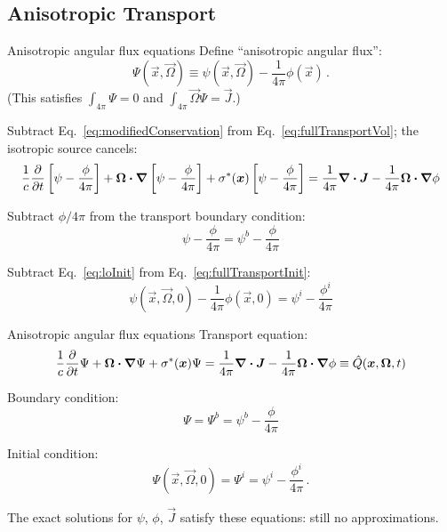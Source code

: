 \documentclass{beamer}
\begin{document}
\subsection{Anisotropic Transport}
\begin{frame}{Anisotropic angular flux equations}
  Define ``anisotropic angular flux'':
  \begin{equation} \label{eq:capPsi}
    \Psi(\vec{x}, \vec{\Omega}) \equiv \psi(\vec{x}, \vec{\Omega})
    - \frac{1}{4\pi} \phi(\vec{x})\,.
  \end{equation}
  (This satisfies $\int_{4\pi} \Psi=0$ and $\int_{4\pi} \vec{\Omega} \Psi =
  \vec{J}$.)

  Subtract Eq.~\eqref{eq:modifiedConservation} from
  Eq.~\eqref{eq:fullTransportVol}; the isotropic source cancels:
\begin{multline*}
  \frac{1}{c} \frac{\partial }{\partial t} \left[ \psi - \frac{\phi}{4\pi} \right]
    + \bm{\Omega}\bm{\cdot} \bm{\nabla} \left[ \psi - \frac{\phi}{4\pi} \right]
    + \sigma^\ast(\bm{x})\left[ \psi - \frac{\phi}{4\pi} \right]
  = \frac{1}{4\pi} \bm{\nabla} \bm{\cdot}\bm{J} -
  \frac{1}{4\pi} \bm{\Omega}\bm{\cdot} \bm{\nabla} \phi
\end{multline*}

  Subtract $\phi/4\pi$ from the transport boundary condition:
  \begin{equation*}
    \psi - \frac{\phi}{4\pi} = \psi^b - \frac{\phi}{4\pi}
  \end{equation*}

  Subtract Eq.~\eqref{eq:loInit} from Eq.~\eqref{eq:fullTransportInit}:
  \begin{equation*}
    \psi(\vec{x}, \vec{\Omega}, 0) - \frac{1}{4\pi}\phi(\vec{x}, 0)
    = \psi^i - \frac{\phi^i}{4\pi}
  \end{equation*}
\end{frame}

\begin{frame}{Anisotropic angular flux equations}
  Transport equation:
\begin{equation*}
  \frac{1}{c} \frac{\partial }{\partial t} \Psi
   + \bm{\Omega}\bm{\cdot} \bm{\nabla} \Psi
   + \sigma^\ast(\bm{x}) \Psi
  = \frac{1}{4\pi} \bm{\nabla} \bm{\cdot}\bm{J} -
  \frac{1}{4\pi} \bm{\Omega}\bm{\cdot} \bm{\nabla} \phi
  \equiv \hat Q(\bm{x}, \bm{\Omega}, t)
\end{equation*}

  Boundary condition:
  \begin{equation*}
    \Psi = \Psi^b = \psi^b - \frac{\phi}{4\pi}
  \end{equation*}

  Initial condition:
  \begin{equation*}
    \Psi(\vec{x}, \vec{\Omega}, 0) = \Psi^i = \psi^i - \frac{\phi^i}{4\pi} \,.
  \end{equation*}

  The exact solutions for $\psi$, $\phi$, $\vec{J}$ satisfy these equations: still
  no approximations.
\end{frame}
\end{document}
